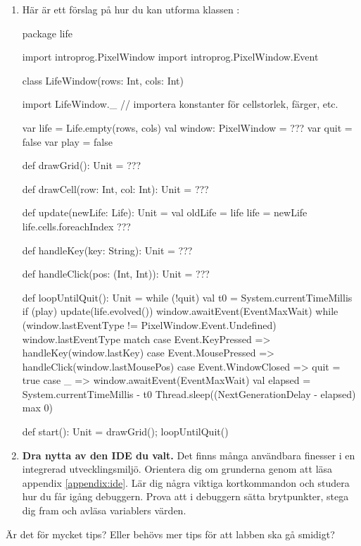 \begin{enumerate}[leftmargin=*]
\item Här är ett förslag på hur du kan utforma klassen :
\begin{CodeSmall}
package life

import introprog.PixelWindow
import introprog.PixelWindow.Event

class LifeWindow(rows: Int, cols: Int){
  import LifeWindow._ // importera konstanter för cellstorlek, färger, etc.

  var life = Life.empty(rows, cols)
  val window: PixelWindow = ???
  var quit = false
  var play = false

  def drawGrid(): Unit = ???

  def drawCell(row: Int, col: Int): Unit = ???

  def update(newLife: Life): Unit = {
    val oldLife = life
    life = newLife
    life.cells.foreachIndex{ ??? }
  }

  def handleKey(key: String): Unit = ???

  def handleClick(pos: (Int, Int)): Unit = ???

  def loopUntilQuit(): Unit = while (!quit) {
    val t0 = System.currentTimeMillis
    if (play) update(life.evolved())
    window.awaitEvent(EventMaxWait)
    while (window.lastEventType != PixelWindow.Event.Undefined) {
      window.lastEventType match {
        case Event.KeyPressed  =>  handleKey(window.lastKey)
        case Event.MousePressed => handleClick(window.lastMousePos)
        case Event.WindowClosed => quit = true
        case _ =>
      }
      window.awaitEvent(EventMaxWait)
    }
    val elapsed = System.currentTimeMillis - t0
    Thread.sleep((NextGenerationDelay - elapsed) max 0)
  }

  def start(): Unit = { drawGrid(); loopUntilQuit() }
}
\end{CodeSmall}

\item \textbf{Dra nytta av den IDE du valt.} Det finns många användbara finesser i en integrerad utvecklingsmiljö. Orientera dig om grunderna genom att läsa appendix \ref{appendix:ide}. Lär dig några viktiga kortkommandon och studera hur du får igång debuggern. Prova att i debuggern sätta brytpunkter, stega dig fram och avläsa variablers värden.
\end{enumerate}

\noindent\TODO Är det för mycket tips? Eller behövs mer tips för att labben ska gå smidigt?
